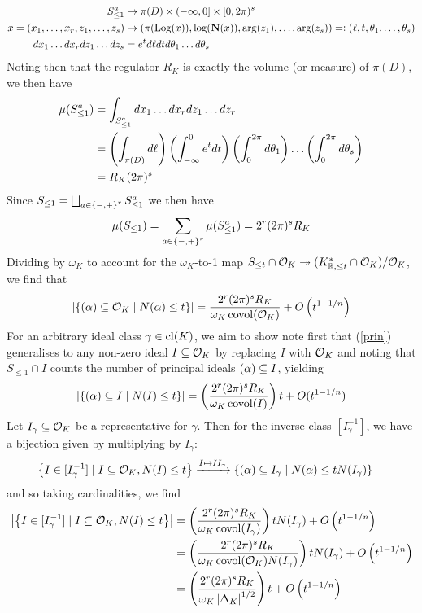 \documentclass[11pt]{report}
\begin{document}
\begin{align*}
    S_{\leq 1}^a &\to \pi(D) \times (-\infty, 0] \times [0, 2\pi)^s \\
    x = (x_1, \ldots, x_r, z_1, \ldots, z_s) &\mapsto (\pi(\operatorname{Log}(x)), \log(\operatorname{\mathbf{N}}(x)), \arg(z_1), \ldots, \arg(z_s)) =\vcentcolon (\ell, t, \theta_1, \ldots, \theta_s) \\
    dx_1 \ldots dx_r dz_1 \ldots dz_s &= e^t d\ell dt d\theta_1 \ldots d\theta_s
\end{align*}
Noting then that the regulator $R_K$ is exactly the volume (or measure) of $\pi(D)$, we then have
\begin{align*}
    \mu(S_{\leq 1}^a) &= \int_{S_{\leq 1}^a} dx_1 \ldots dx_r dz_1 \ldots dz_r \\
    &= \left(  \int_{\pi(D)} d\ell  \right)\left(  \int_{-\infty}^0 e^t dt  \right)\left(  \int_0^{2\pi} d\theta_1  \right) \ldots \left(  \int_0^{2\pi} d\theta_s  \right) \\
    &= R_K(2\pi)^s
\end{align*}
Since $S_{\leq 1} = \bigsqcup_{a \in \left\{  -, +  \right\}^r} S_{\leq 1}^a$ we then have
$$
    \mu(S_{\leq 1}) = \sum_{a \in \left\{  -, +  \right\}^r}\mu(S_{\leq 1}^a) = 2^r(2\pi)^sR_K
$$
Dividing by $\omega_K$ to account for the $\omega_K$-to-1 map $S_{\leq t} \cap \mathcal{O}_K \twoheadrightarrow (K_{\mathbb{R}, \leq t}^* \cap \mathcal{O}_K) / \mathcal{O}_K$, we find that
\begin{align}\label{prin}
    \left| \left\{  (\alpha) \subseteq \mathcal{O}_K \mid N(\alpha) \leq t  \right\} \right| = \frac{2^r(2\pi)^sR_K}{\omega_K\operatorname{covol}(\mathcal{O}_K)} + O\left(  t^{1 - 1/n}  \right)
\end{align}
For an arbitrary ideal class $\gamma \in \operatorname{cl}(K)$, we aim to show  note first that (\ref{prin}) generalises to any non-zero ideal $I \subseteq \mathcal{O}_K$ by replacing $I$ with $\mathcal{O}_K$ and noting that $S_{\leq 1} \cap I$ counts the number of principal ideals $(\alpha) \subseteq I$, yielding
\begin{align}
    \left| \left\{  (\alpha) \subseteq I \mid N(I) \leq t  \right\} \right| = \left(  \frac{2^r(2\pi)^sR_K}{\omega_K\operatorname{covol}(I)}  \right)t + O(t^{1 - 1/n})
\end{align}
Let $I_\gamma \subseteq \mathcal{O}_K$ be a representative for $\gamma$. Then for the inverse class $[I_\gamma^{-1}]$, we have a bijection given by multiplying by $I_\gamma$:
\begin{align*}
    \left\{  I \in [I_{\gamma}^{-1}] \mid I \subseteq \mathcal{O}_K, N(I) \leq t  \right\} &\xrightarrow{I \mapsto II_\gamma} \left\{  (\alpha) \subseteq I_\gamma \mid N(\alpha) \leq tN(I_\gamma)  \right\}
\end{align*}
and so taking cardinalities, we find
\begin{align*}
    \left| \left\{  I \in [I_{\gamma}^{-1}] \mid I \subseteq \mathcal{O}_K, N(I) \leq t  \right\} \right| &= \left(  \frac{2^r(2\pi)^s R_K}{\omega_K \operatorname{covol}(I_\gamma)}  \right)tN(I_\gamma) + O\left(  t^{1 - 1/n}  \right) \\
    &= \left(  \frac{2^r(2\pi)^s R_K}{\omega_K \operatorname{covol}(\mathcal{O}_K)N(I_\gamma)}  \right)tN(I_\gamma) + O\left(  t^{1 - 1/n}  \right) \\
    &= \left(  \frac{2^r(2\pi)^s R_K}{\omega_K \left| \Delta_K \right|^{1/2}}  \right)t + O\left(  t^{1 - 1/n}  \right)
\end{align*}
\end{document}
